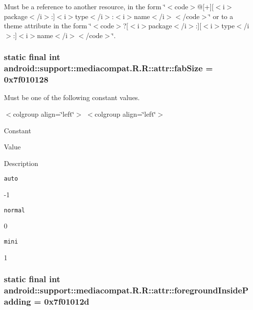 Must be a reference to another resource, in the form \char`\"{}$<$code$>$@\mbox{[}+\mbox{]}\mbox{[}$<$i$>$package$<$/i$>$:\mbox{]}$<$i$>$type$<$/i$>$:$<$i$>$name$<$/i$>$$<$/code$>$\char`\"{} or to a theme attribute in the form \char`\"{}$<$code$>$?\mbox{[}$<$i$>$package$<$/i$>$:\mbox{]}\mbox{[}$<$i$>$type$<$/i$>$:\mbox{]}$<$i$>$name$<$/i$>$$<$/code$>$\char`\"{}. \hypertarget{classandroid_1_1support_1_1mediacompat_1_1_r_1_1attr_e5d587e84d8e9cbde78d75ac01ca8bd6}{
\subsubsection[{fabSize}]{\setlength{\rightskip}{0pt plus 5cm}static final int android::support::mediacompat.R.R::attr::fabSize = 0x7f010128}}
\label{classandroid_1_1support_1_1mediacompat_1_1_r_1_1attr_e5d587e84d8e9cbde78d75ac01ca8bd6}


Must be one of the following constant values. \begin{TabularC}{0}
\hline
\end{TabularC}
$<$colgroup align=\char`\"{}left\char`\"{}$>$ $<$colgroup align=\char`\"{}left\char`\"{}$>$ 

Constant

Value

Description 

{\tt auto}

-1

{\tt normal}

0

{\tt mini}

1\hypertarget{classandroid_1_1support_1_1mediacompat_1_1_r_1_1attr_422861e2b84a2dc4cfb0cd273743fa14}{
\subsubsection[{foregroundInsidePadding}]{\setlength{\rightskip}{0pt plus 5cm}static final int android::support::mediacompat.R.R::attr::foregroundInsidePadding = 0x7f01012d}}
\label{classandroid_1_1support_1_1mediacompat_1_1_r_1_1attr_422861e2b84a2dc4cfb0cd273743fa14}


